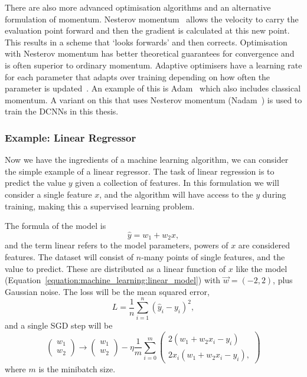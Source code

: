 There are also more advanced optimisation algorithms and an alternative formulation of momentum.
Nesterov momentum~\cite{Nesterov} allows the velocity to carry the evaluation point forward and then the gradient is calculated at this new point. 
This results in a scheme that `looks forwards' and then corrects.
Optimisation with Nesterov momentum has better theoretical guarantees for convergence and is often superior to ordinary momentum.
Adaptive optimisers have a learning rate for each parameter that adapts over training depending on how often the parameter is updated~\cite{CS231n}.
An example of this is Adam~\cite{Adam} which also includes classical momentum. A variant on this that uses Nesterov momentum (Nadam~\cite{Nadam}) is used to train the DCNNs in this thesis. 






\subsubsection{Example: Linear Regressor}
Now we have the ingredients of a machine learning algorithm, we can consider the simple example of a linear regressor. 
The task of linear regression is to predict the value $y$ given a collection of features. In this formulation we will consider a single feature $x$, and the algorithm will have access to the $y$ during training, making this a supervised learning problem. 

The formula of the model is
\begin{equation}
    \hat{y} = w_{1} + w_{2}x,
    \label{equation:machine_learning:linear_model}
\end{equation}
and the term linear refers to the model parameters, powers of $x$ are considered features. 
The dataset will consist of $n$-many points of single features, and the value to predict. 
These are distributed as a linear function of $x$ like the model (Equation~\ref{equation:machine_learning:linear_model}) with $\vec{w} = (-2,2)$, plus Gaussian noise.
The loss will be the mean squared error,
\begin{equation}
    L = \frac{1}{n}\sum_{i=1}^{n}(\hat{y}_{i}-y_{i})^{2},
\end{equation} 
and a single SGD step will be 
\begin{equation}
    \begin{pmatrix}
        w_{1} \\
        w_{2}
    \end{pmatrix} \rightarrow
    \begin{pmatrix}
        w_{1} \\
        w_{2}
    \end{pmatrix} - \eta
    \frac{1}{m}\sum_{i=0}^{m}
    \begin{pmatrix}
        2(w_{1}+w_{2}x_{i} - y_{i})\\
        2x_{i}(w_{1}+w_{2}x_{i} - y_{i}),
    \end{pmatrix}
\end{equation}
where $m$ is the minibatch size.

